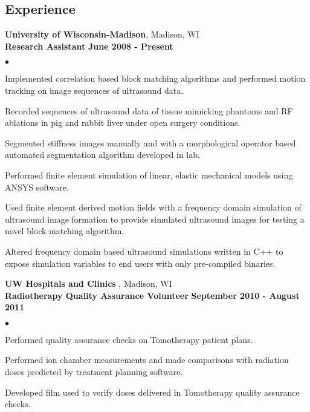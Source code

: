\documentclass[margin,line]{res}
\newenvironment{list2}{
  \begin{list}{$\bullet$}{%
      \setlength{\itemsep}{0in}
      \setlength{\parsep}{0in} \setlength{\parskip}{0in}
      \setlength{\topsep}{0in} \setlength{\partopsep}{0in}
      \setlength{\leftmargin}{0.2in}}}{\end{list}}
\begin{document}
\begin{resume}
\section{\sc Experience}

{\bf University of Wisconsin-Madison}, Madison, WI \\
{\bf  Research Assistant} \hfill {\bf June 2008 - Present} \\
\vspace{-.2cm}
\begin{list2}
\item Implemented correlation based block matching algorithms and performed motion tracking on image sequences of ultrasound data.
\item Recorded sequences of ultrasound data of tissue mimicking phantoms and RF ablations in pig and rabbit liver under open surgery conditions.
\item Segmented stiffness images manually and with a morphological operator based automated segmentation algorithm developed in lab. 
\item Performed finite element simulation of linear, elastic mechanical models using ANSYS software.
\item Used finite element derived motion fields with a frequency domain simulation of ultrasound image formation
 to provide simulated ultrasound images for testing a novel block matching algorithm. 
\item Altered frequency domain based ultrasound simulations written in C++ to expose simulation variables to end users with only pre-compiled binaries.
\end{list2}

\vspace{.2cm}

{\bf UW Hospitals and Clinics }, Madison, WI \\
{\bf Radiotherapy Quality Assurance Volunteer} \hfill {\bf September 2010 - August 2011} \\
\vspace{-.2cm}
\begin{list2}
\item Performed quality assurance checks on Tomotherapy patient plans.
\item Performed ion chamber measurements and made comparisons with radiation doses predicted by treatment planning software.
\item Developed film used to verify doses delivered in Tomotherapy quality assurance checks.
\end{list2}


\end{resume}
\end{document}
